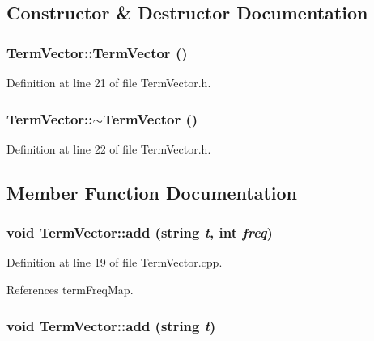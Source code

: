 \subsection{Constructor \& Destructor Documentation}
\hypertarget{classTermVector_77c2b9d27f5916a24f053c3a98e43ae6}{
\subsubsection[{TermVector}]{\setlength{\rightskip}{0pt plus 5cm}TermVector::TermVector ()}}
\label{classTermVector_77c2b9d27f5916a24f053c3a98e43ae6}




Definition at line 21 of file TermVector.h.\hypertarget{classTermVector_3a04d9e2e7a3ab37725c5be509ab839a}{
\subsubsection[{$\sim$TermVector}]{\setlength{\rightskip}{0pt plus 5cm}TermVector::$\sim$TermVector ()}}
\label{classTermVector_3a04d9e2e7a3ab37725c5be509ab839a}




Definition at line 22 of file TermVector.h.

\subsection{Member Function Documentation}
\hypertarget{classTermVector_af6ec826119a4dce1077c3281129123a}{
\subsubsection[{add}]{\setlength{\rightskip}{0pt plus 5cm}void TermVector::add (string {\em t}, \/  int {\em freq})}}
\label{classTermVector_af6ec826119a4dce1077c3281129123a}




Definition at line 19 of file TermVector.cpp.

References termFreqMap.\hypertarget{classTermVector_170945bb374e075eb6ba5b4ca18ecb42}{
\subsubsection[{add}]{\setlength{\rightskip}{0pt plus 5cm}void TermVector::add (string {\em t})}}
\label{classTermVector_170945bb374e075eb6ba5b4ca18ecb42}




